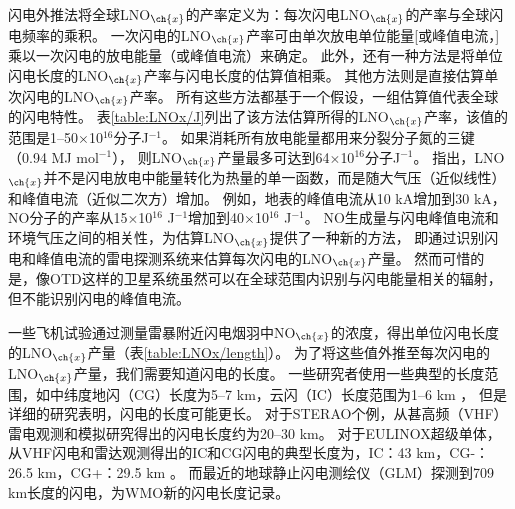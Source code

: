 闪电外推法将全球LNO$_{\ch{x}}$的产率定义为：每次闪电LNO$_{\ch{x}}$的产率与全球闪电频率的乘积\citep{Lawrence.1995}。
一次闪电的LNO$_{\ch{x}}$产率可由单次放电单位能量[或峰值电流，\citet{Wang.1998}]乘以一次闪电的放电能量（或峰值电流）来确定。
此外，还有一种方法是将单位闪电长度的LNO$_{\ch{x}}$产率与闪电长度的估算值相乘。
其他方法则是直接估算单次闪电的LNO$_{\ch{x}}$产率。
所有这些方法都基于一个假设，一组估算值代表全球的闪电特性。
表\ref{table:LNOx/J}列出了该方法估算所得的LNO$_{\ch{x}}$产率，该值的范围是1--50$\times$10$^{16}$分子J$^{-1}$。
如果消耗所有放电能量都用来分裂分子氮的三键（0.94 MJ mol$^{-1}$），
则LNO$_{\ch{x}}$产量最多可达到64$\times$10$^{16}$分子J$^{-1}$。
\citet{Wang.1998}指出，LNO$_{\ch{x}}$并不是闪电放电中能量转化为热量的单一函数，而是随大气压（近似线性）和峰值电流（近似二次方）增加。
例如，地表的峰值电流从10 kA增加到30 kA，NO分子的产率从15$\times$10$^{16}$ J$^{-1}$增加到40$\times$10$^{16}$ J$^{-1}$。
NO生成量与闪电峰值电流和环境气压之间的相关性，为估算LNO$_{\ch{x}}$提供了一种新的方法，
即通过识别闪电和峰值电流的雷电探测系统来估算每次闪电的LNO$_{\ch{x}}$产量。
然而可惜的是，像OTD这样的卫星系统虽然可以在全球范围内识别与闪电能量相关的辐射\citep{Baker.1999}，但不能识别闪电的峰值电流。


一些飞机试验通过测量雷暴附近闪电烟羽中NO$_{\ch{x}}$的浓度，得出单位闪电长度的LNO$_{\ch{x}}$产量（表\ref{table:LNOx/length}）。
为了将这些值外推至每次闪电的LNO$_{\ch{x}}$产量，我们需要知道闪电的长度。
一些研究者使用一些典型的长度范围，如中纬度地闪（CG）长度为5--7 km，云闪（IC）长度范围为1--6 km \citep{Price.1997b}，
但是详细的研究表明，闪电的长度可能更长\citep{Defer.2001,Thery.2001,Peterson.2020b}。
对于STERAO个例，从甚高频（VHF）雷电观测和模拟研究得出的闪电长度约为20--30 km\citep{Defer.2001}。
对于EULINOX超级单体，从VHF闪电和雷达观测得出的IC和CG闪电的典型长度为，IC：43 km，CG-：26.5 km，CG+：29.5 km \citep{Dotzek.2000}。
而最近的地球静止闪电测绘仪（GLM）探测到709 km长度的闪电，为WMO新的闪电长度记录\citep{Peterson.2020b}。



